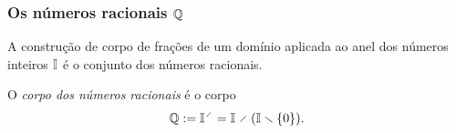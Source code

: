\begin{comment}
(Homomorfismo de monoide) Sejam $\frac{n}{d},\frac{n'}{d'} \in Q(D)$. Então
	\begin{align*}
	\bar h\left( \frac{n}{d}\frac{n'}{d'} \right) &= \bar h\left( \frac{nn'}{dd'} \right) \\
		&= h(nn')h(dd')\inv \\
		&= h(n)h(n')h(d)\inv h(d')\inv \\
		&= h(n)h(d)\inv h(n')h(d')\inv \\
		&= \bar h\left( \frac{n}{d} \right)\bar h \left( \frac{n'}{d'} \right).
	\end{align*}
Ainda, como $h$ é homomorfismo de anel, $h(1)=1$, logo
	\begin{equation*}
	\bar h\left( \frac{1}{1} \right) = h(1)h(1)\inv = 1.
	\end{equation*}

(Injetividade) Sejam $\frac{n}{d},\frac{n'}{d'} \in Q(D)$ tais que $\bar h(\frac{n}{d}) = \bar h(\frac{n'}{d'})$. Então
	\begin{align*}
	0 &= \bar h \left( \frac{n}{d} \right) - \bar h \left( \frac{n'}{d'} \right) \\
		&= \bar h \left( \frac{n}{d} - \frac{n'}{d'} \right) \\
		&= \bar h \left( \frac{nd'-dn'}{dd'} \right) \\
		&= h(nd'-dn')h(dd')\inv.
	\end{align*}
Como $d \neq 0$ e $d' \neq 0$, segue que $h(nd'-dn')=0$, e da injetividade de $h$ segue que $nd'-dn'=0$, logo $nd'=dn'$, o que significa que $\frac{n}{d} = \frac{n'}{d'}$.

\end{proof}


\end{comment}


\subsubsection{Os números racionais \ensuremath{\Q}}

A construção de corpo de frações de um domínio aplicada ao anel dos números inteiros $\mathbb{I}$ é o conjunto dos números racionais.

\begin{definition}
O \emph{corpo dos números racionais} é o corpo
	\begin{equation*}
	\Q := \Z^{\olddiv} = \Z \olddiv (\Z \setminus \{0\}).
	\end{equation*}
\end{definition}





